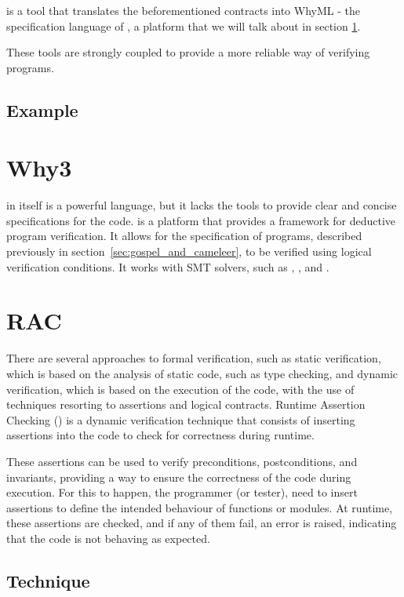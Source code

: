 \cameleer is a tool that translates the beforementioned contracts into WhyML - 
the specification language of \why, a platform that we will talk about in 
section \ref{sec:why3}.

These tools are strongly coupled to provide a more reliable way of verifying 
\ocaml programs.

\subsection{Example}
\label{sub:example}

\section{Why3}
\label{sec:why3}

\ocaml in itself is a powerful language, but it lacks the tools to provide clear 
and concise specifications for the code. \why is a platform that provides a framework 
for deductive program verification. It allows for the specification of programs, 
described previously in section~\ref{sec:gospel_and_cameleer}, to be verified using 
logical verification conditions. It works with SMT solvers, such as \zthree, \altergo, 
and \coq.

\section{RAC}
\label{sec:rac}

There are several approaches to formal verification, such as static verification, 
which is based on the analysis of static code, such as type checking, and dynamic 
verification, which is based on the execution of the code, with the use of 
techniques resorting to assertions and logical contracts. Runtime Assertion Checking 
(\rac) is a dynamic verification technique that consists of inserting assertions 
into the code to check for correctness during runtime.

These assertions can be used to verify preconditions, postconditions, and invariants, 
providing a way to ensure the correctness of the code during execution. For this to 
happen, the programmer (or tester), need to insert assertions to define the intended 
behaviour of functions or modules. At runtime, these assertions are checked, and if 
any of them fail, an error is raised, indicating that the code is not behaving as 
expected.

\subsection{Technique}
\label{sub:technique}

